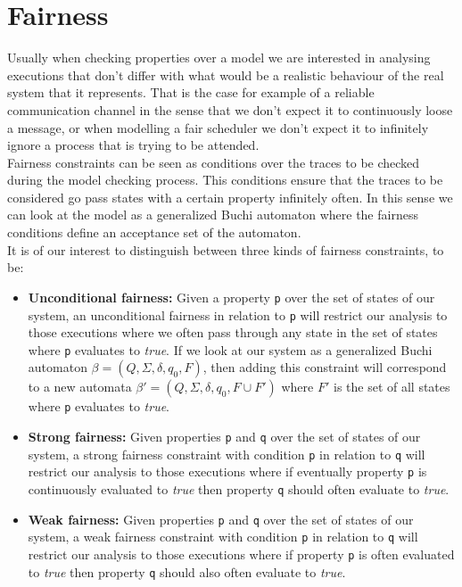 \documentclass[12pt]{article}
\begin{document}


\section{Fairness}\label{fairness}

Usually when checking properties over a model we are interested in analysing 
executions that don't differ with what would be a realistic behaviour of the
real system that it represents. That is the case for example of a reliable
communication channel in the sense that we don't expect it to continuously
loose a message, or when modelling a fair scheduler we don't expect it to
infinitely ignore a process that is trying to be attended.\\
Fairness constraints can be seen as conditions over the traces to be checked
during the model checking process. This conditions ensure that the traces %
to be considered go pass states with a certain property infinitely often. In
this sense we can look at the model as a generalized Buchi automaton where %
the fairness conditions define an acceptance set of the automaton.\\
It is of our interest to distinguish between three kinds of fairness
constraints, to be:
\begin{itemize}

\item \textbf{Unconditional fairness:} Given a property \texttt{p} over the
set of states of our system, an unconditional fairness in relation to
\texttt{p} will restrict our analysis to those executions where we often pass
through any state in the set of states where \texttt{p} evaluates to
\textit{true}. If we look at our system as a generalized Buchi automaton
$\beta=(Q,\Sigma,\delta,q_{0},F)$, then adding this constraint will correspond
to a new automata $\beta'=(Q,\Sigma,\delta,q_{0},F\cup F')$ where $F'$ is the
set of all states where \texttt{p} evaluates to \textit{true}. 

\item \textbf{Strong fairness:} Given properties \texttt{p} and \texttt{q}
over the set of states of our system, a strong fairness constraint with
condition \texttt{p} in relation to \texttt{q} will restrict our analysis
to those executions where if eventually property \texttt{p} is continuously
evaluated to \textit{true} then property \texttt{q} should often evaluate
to \textit{true}. %

\item \textbf{Weak fairness:} Given properties \texttt{p} and \texttt{q}
over the set of states of our system, a weak fairness constraint with
condition \texttt{p} in relation to \texttt{q} will restrict our analysis
to those executions where if property \texttt{p} is often evaluated to 
\textit{true} then property \texttt{q} should also often evaluate to
\textit{true}. %

\end{itemize}
\end{document}
